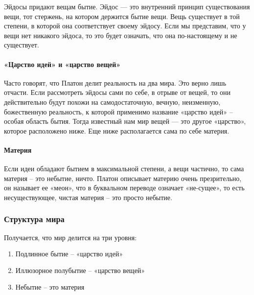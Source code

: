 \documentclass[
]{article}
\providecommand{\tightlist}{%
  \setlength{\itemsep}{0pt}\setlength{\parskip}{0pt}}
\begin{document}
Эйдосы придают вещам бытие. Эйдос --- это внутренний принцип
существования вещи, тот стержень, на котором держится бытие вещи. Вещь
существует в той степени, в которой она соответствует своему эйдосу.
Если мы представим, что у вещи нет никакого эйдоса, то это будет
означать, что она по-настоящему и не существует.

\hypertarget{ux446ux430ux440ux441ux442ux432ux43e-ux438ux434ux435ux439-ux438-ux446ux430ux440ux441ux442ux432ux43e-ux432ux435ux449ux435ux439}{%
\paragraph{«Царство идей» и «царство
вещей»}\label{ux446ux430ux440ux441ux442ux432ux43e-ux438ux434ux435ux439-ux438-ux446ux430ux440ux441ux442ux432ux43e-ux432ux435ux449ux435ux439}}

Часто говорят, что Платон делит реальность на два мира. Это верно лишь
отчасти. Если рассмотреть эйдосы сами по себе, в отрыве от вещей, то они
действительно будут похожи на самодостаточную, вечную, неизменную,
божественную реальность, к которой применимо название «царство идей» --
особая область бытия. Тогда известный нам мир вещей --- это другое
«царство», которое расположено ниже. Еще ниже располагается сама по себе
материя.

\hypertarget{ux43cux430ux442ux435ux440ux438ux44f}{%
\paragraph{Материя}\label{ux43cux430ux442ux435ux440ux438ux44f}}

Если идеи обладают бытием в максимальной степени, а вещи частично, то
сама материя -- это небытие, ничто. Платон описывает материю очень
презрительно, он называет ее «меон», что в буквальном переводе означает
«не-сущее», то есть несуществующее, чистая материя -- это просто
небытие.

\hypertarget{ux441ux442ux440ux443ux43aux442ux443ux440ux430-ux43cux438ux440ux430}{%
\subsubsection{Структура
мира}\label{ux441ux442ux440ux443ux43aux442ux443ux440ux430-ux43cux438ux440ux430}}

Получается, что мир делится на три уровня:

\begin{enumerate}
\def\labelenumi{\arabic{enumi}.}
\tightlist
\item
  Подлинное бытие -- «царство идей»
\item
  Иллюзорное полубытие -- «царство вещей»
\item
  Небытие -- это материя
\end{enumerate}
\end{document}
